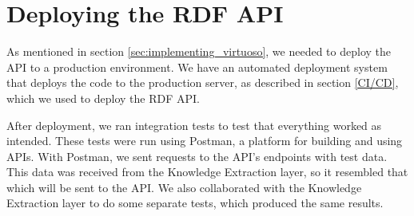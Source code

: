 \section{Deploying the RDF API}
As mentioned in section \ref{sec:implementing_virtuoso}, we needed to deploy the API to a production environment.
We have an automated deployment system that deploys the code to the production server, as described in section \ref{CI/CD}, which we used to deploy the RDF API.

After deployment, we ran integration tests to test that everything worked as intended. These tests were run using Postman, a platform for building and using APIs\cite{PostmanAPIPlatform}. With Postman, we sent requests to the API's endpoints with \knox{} test data. This data was received from the Knowledge Extraction layer, so it resembled that which will be sent to the API.
We also collaborated with the Knowledge Extraction layer to do some separate tests, which produced the same results.
